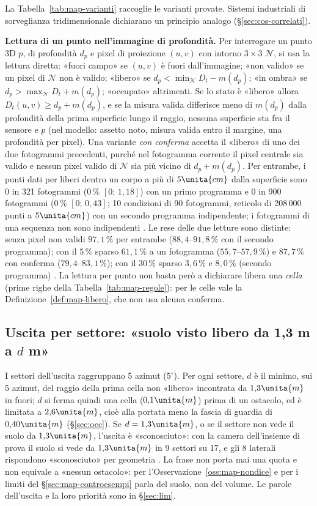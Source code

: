 La Tabella~\ref{tab:map-varianti} raccoglie le varianti provate. Sistemi industriali di sorveglianza tridimensionale dichiarano un principio analogo (\S\ref{sec:cos-correlati}).

\textbf{Lettura di un punto nell'immagine di profondità.} Per interrogare un punto 3D $p$, di profondità $d_p$ e pixel di proiezione $(u,v)$ con intorno $3\times3$ $\mathcal N$, si usa la lettura diretta: «fuori campo» se $(u,v)$ è fuori dall'immagine; «non valido» se un pixel di $\mathcal N$ non è valido; «libero» se $d_p<\min_{\mathcal N}D_t-m(d_p)$; «in ombra» se $d_p>\max_{\mathcal N}D_t+m(d_p)$; «occupato» altrimenti. Se lo stato è «libero» allora $D_t(u,v)\ge d_p+m(d_p)$, e se la misura valida differisce meno di $m(d_p)$ dalla profondità della prima superficie lungo il raggio, nessuna superficie sta fra il sensore e $p$  (nel modello: assetto noto, misura valida entro il margine, una profondità per pixel). Una variante \emph{con conferma} accetta il «libero» di uno dei due fotogrammi precedenti, purché nel fotogramma corrente il pixel centrale sia valido e nessun pixel valido di $\mathcal N$ sia più vicino di $d_p+m(d_p)$. Per entrambe, i punti dati per liberi dentro un corpo a più di $5\unita{cm}$ dalla superficie sono 0 in 321 fotogrammi ($0\,\%$ $[0;\,1{,}18]$) con un primo programma e 0 in 900 fotogrammi ($0\,\%$ $[0;\,0{,}43]$; 10 condizioni di 90 fotogrammi, reticolo di 208\,000 punti a $5\unita{cm}$) con un secondo programma indipendente; i fotogrammi di una sequenza non sono indipendenti . Le rese delle due letture sono distinte: senza pixel non validi $97{,}1\,\%$ per entrambe ($88{,}4$–$91{,}8\,\%$ con il secondo programma); con il $5\,\%$ sparso $61{,}1\,\%$ a un fotogramma ($55{,}7$–$57{,}9\,\%$) e $87{,}7\,\%$ con conferma ($79{,}4$–$83{,}1\,\%$); con il $30\,\%$ sparso $3{,}6\,\%$ e $8{,}0\,\%$ (secondo programma) . La lettura per punto non basta però a dichiarare libera una \emph{cella} (prime righe della Tabella~\ref{tab:map-regole}): per le celle vale la Definizione~\ref{def:map-libero}, che non usa alcuna conferma.

\subsection{Uscita per settore: «suolo visto libero da 1,3 m a $d$ m»}\label{sec:map-uscita}

I settori dell'uscita raggruppano 5 azimut ($5^\circ$). Per ogni settore, $d$ è il minimo, sui 5 azimut, del raggio della prima cella non «libero» incontrata da $1{,}3\unita{m}$ in fuori; $d$ si ferma quindi una cella ($0{,}1\unita{m}$) prima di un ostacolo, ed è limitata a $2{,}6\unita{m}$, cioè alla portata meno la fascia di guardia di $0{,}40\unita{m}$ (\S\ref{sec:occ}). Se $d=1{,}3\unita{m}$, o se il settore non vede il suolo da $1{,}3\unita{m}$, l'uscita è «sconosciuto»: con la camera dell'insieme di prova il suolo si vede da $1{,}3\unita{m}$ in 9 settori su 17, e gli 8 laterali rispondono «sconosciuto» per geometria . La frase non porta mai una quota e non equivale a «nessun ostacolo»: per l'Osservazione~\ref{oss:map-nondice} e per i limiti del \S\ref{sec:map-controesempi} parla del suolo, non del volume. Le parole dell'uscita e la loro priorità sono in \S\ref{sec:lim}.

